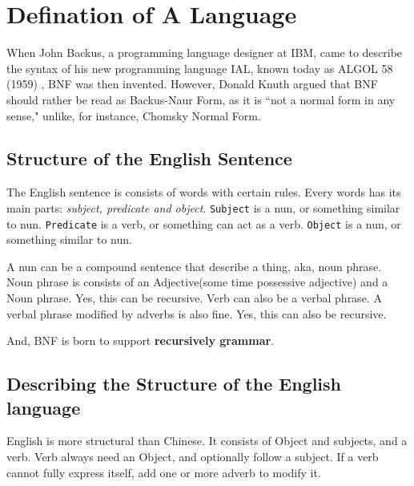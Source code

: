 \section{Defination of A Language}
When John Backus, a programming language designer at IBM, came to describe the syntax of his new programming language IAL, known today as ALGOL 58 (1959)\cite{BNF_ALGOL} , BNF was then invented.
However, Donald Knuth argued that BNF should rather be read as Backus-Naur Form, as it is ``not a normal form in any sense,\cite{BNFvsBNF}" unlike, for instance, Chomsky Normal Form.

\subsection{Structure of the English Sentence}
The English sentence is consists of words with certain rules. Every words has its main parts: \emph{subject, predicate and object}.
{\tt Subject} is a nun, or something similar to nun. 
{\tt Predicate} is a verb, or something can act as a verb.
{\tt Object} is a nun, or something similar to nun. 

A nun can be a compound sentence that describe a thing, aka, noun phrase.
Noun phrase is consists of an Adjective(some time possessive adjective) and a Noun phrase. Yes, this can be recursive. 
Verb can also be a verbal phrase. A verbal phrase modified by adverbs is also fine. Yes, this can also be recursive. 

And, BNF is born to support {\bf recursively grammar}.


\subsection{Describing the Structure of the English language}

English is more structural than Chinese. It consists of Object and subjects, and a verb.	
Verb always  need an Object, and optionally follow a subject. If a verb cannot fully express itself, add one or more adverb to modify it.